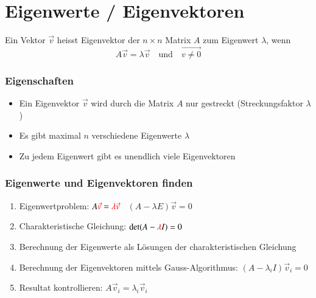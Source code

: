 \section{Eigenwerte / Eigenvektoren}   

Ein Vektor $\vec{v}$ heisst Eigenvektor der $n \times n$ Matrix $A$ zum Eigenwert $\lambda$, wenn 
$$A \vec{v} = \lambda \vec{v} \quad \text{und} \quad \vec{v \neq 0}$$


\subsubsection{Eigenschaften}

\begin{itemize}
	\item Ein Eigenvektor $\vec{v}$ wird durch die Matrix $A$ nur gestreckt (Streckungsfaktor $\lambda$)
	\item Es gibt maximal $n$ verschiedene Eigenwerte $\lambda$
	\item Zu jedem Eigenwert gibt es unendlich viele Eigenvektoren
\end{itemize}


\subsubsection{Eigenwerte und Eigenvektoren finden}
	
\begin{enumerate}
	\item Eigenwertproblem: $A {\color{red}\vec{v}} = {\color{red}\lambda \vec{v}}$ \textrightarrow\  $(A - \lambda E) \vec{v} = 0$
	\item Charakteristische Gleichung: $\det(A -  {\color{red}\lambda} I) = 0$
	\item Berechnung der Eigenwerte  als Lösungen der charakteristischen Gleichung
	\item Berechnung der Eigenvektoren  mittels Gauss-Algorithmus: $(A - \lambda_i I) \vec{v}_i = 0$
	\item Resultat kontrollieren: $A \vec{v}_i = \lambda_i \vec{v}_i$
\end{enumerate}


